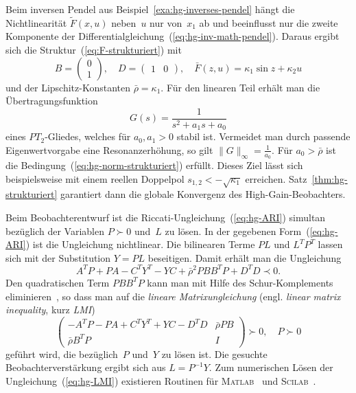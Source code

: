 \begin{example}
\label{exa:hg-inverses-pendel-struktur}Beim inversen Pendel aus Beispiel~\ref{exa:hg-inverses-pendel}
hängt die Nichtlinearität $\widetilde{F}(x,u)$ neben~$u$ nur von~$x_{1}$
ab und beeinflusst nur die zweite Komponente der Differentialgleichung~(\ref{eq:hg-inv-math-pendel}).
Daraus ergibt sich die Struktur~(\ref{eq:F-strukturiert}) mit
\[
B=\left(\begin{array}{c}
0\\
1
\end{array}\right),\quad D=\left(\begin{array}{cc}
1 & 0\end{array}\right),\quad\bar{F}(z,u)=\kappa_{1}\sin z+\kappa_{2}u
\]
und der Lipschitz-Konstanten $\bar{\rho}=\kappa_{1}$. Für den linearen
Teil erhält man die Übertragungsfunktion
\[
G(s)=\frac{1}{s^{2}+a_{1}s+a_{0}}
\]
eines $PT_{2}$-Gliedes, welches für $a_{0},a_{1}>0$ stabil ist.
Vermeidet man durch passende Eigenwertvorgabe eine Resonanzerhöhung,
so gilt $\|G\|_{\infty}=\tfrac{1}{a_{0}}.$ Für $a_{0}>\bar{\rho}$
ist die Bedingung~(\ref{eq:hg-norm-strukturiert}) erfüllt. Dieses
Ziel lässt sich beispielsweise mit einem reellen Doppelpol $s_{1,2}<-\sqrt{\kappa_{1}}$
erreichen. Satz~\ref{thm:hg-strukturiert} garantiert dann die globale
Konvergenz des High-Gain-Beobachters.
\end{example}

\begin{remark}
\label{rem:High-Gain-Beobachter-LMI}Beim Beobachterentwurf ist die
Riccati-Ungleichung~(\ref{eq:hg-ARI}) simultan bezüglich der Variablen
$P\succ0$ und~$L$ zu lösen. In der gegebenen Form~(\ref{eq:hg-ARI})
ist die Ungleichung nichtlinear. Die bilinearen Terme $PL$ und $L^{T}P^{T}$
lassen sich mit der Substitution $Y=PL$ beseitigen. Damit erhält
man die Ungleichung 
\[
A^{T}P+PA-C^{T}Y^{T}-YC+\bar{\rho}^{2}PBB^{T}P+D^{T}D\prec0.
\]
Den quadratischen Term $PBB^{T}P$ kann man mit Hilfe des Schur-Komplements
eliminieren~\cite{boyd1994}, so dass man auf die \emph{lineare Matrix\-ungleichung}
(engl. \emph{linear matrix inequality}, kurz \emph{LMI})
\begin{equation}
\left(\begin{array}{cc}
-A^{T}P-PA+C^{T}Y^{T}+YC-D^{T}D & \bar{\rho}PB\\
\bar{\rho}B^{T}P & I
\end{array}\right)\succ0,\quad P\succ0\label{eq:hg-LMI}
\end{equation}
geführt wird, die bezüglich~$P$ und~$Y$ zu lösen ist. Die gesuchte
Beobachterverstärkung ergibt sich aus $L=P^{-1}Y$. Zum numerischen
Lösen der Ungleichung~(\ref{eq:hg-LMI}) existieren Routinen für
\textsc{Matlab}~\cite{gahinet1995} und \textsc{Scilab}~\cite{nikoukhah1995}.
\end{remark}


